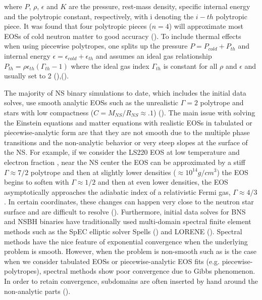 where $P$, $\rho$, $\epsilon$ and $K$ are the pressure, rest-mass density, specific internal energy and the polytropic constant, respectively, with i denoting the $i-th$ polytropic piece. It was found that four polytropic pieces ($n=4$) will approximate most EOSs of cold neutron matter to good accuracy (\cite{read2008neutron}). To include thermal effects when using piecewise polytropes, one splits up the pressure $P = P_{cold} + P_{th}$ and internal energy $\epsilon = \epsilon_{cold}+\epsilon_{th}$ and assumes an ideal gas relationship $P_{th} = \rho \epsilon_{th}(\Gamma_{th}-1)$ where the ideal gas index $\Gamma_{th}$ is constant for all $\rho$ and $\epsilon$ and usually set to 2 (\cite{bauswein2010testing}),(\cite{takami2014constraining}).

 The majority of NS binary simulations to date, which includes the initial data solves, use smooth analytic EOSs such as the unrealistic $\Gamma = 2$ polytrope and stars with low compactness ($C = M_{NS}/R_{NS} \approx .1$) (\cite{faber2012binary}). The main issue with solving the Einstein equations and matter equations with realistic EOSs in tabulated or piecewise-analytic form are that they are not smooth due to the multiple phase transitions and the non-analytic behavior or very steep slopes at the surface of the NS. For example, if we consider the LS220 EOS at low temperature and electron fraction \cite{lattimer1991generalized}, near the NS center the EOS can be approximated by a stiff $\Gamma \approx 7/2$ polytrope and then at slightly lower densities ($\approx 10^{14} g/cm^{3}$) the EOS begins to soften with $\Gamma \approx 1/2$ and then at even lower densities, the EOS asymptotically approaches the adiabatic index of a relativistic Fermi gas, $\Gamma \approx 4/3$. In certain coordinates, these changes can happen very close to the neutron star surface and are difficult to resolve (\cite{deaton2013black}). Furthermore, initial data solves for BNS and NSBH binaries have traditionally used multi-domain spectral finite element methods such as the SpEC elliptic solver Spells (\cite{pfeiffer2003multidomain}) and LORENE (\cite{gourgoulhon2001quasiequilibrium}). Spectral methods have the nice feature of exponential convergence when the underlying problem is smooth. However, when the problem is non-smooth such as is the case when we consider tabulated EOSs or piecewise-analytic EOS fits (e.g. piecewise-polytropes), spectral methods show poor convergence due to Gibbs phenomenon. In order to retain convergence, subdomains are often inserted by hand around the non-analytic parts (\cite{deaton2013black}). 

